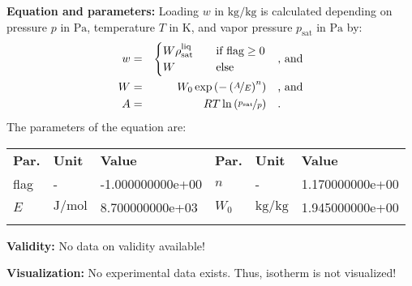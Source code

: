 \textbf{Equation and parameters:}
\newline
%
Loading $w$ in $\si{\kilogram\per\kilogram}$ is calculated depending on pressure $p$ in $\si{\pascal}$, temperature $T$ in $\si{\kelvin}$, and vapor pressure $p_\mathrm{sat}$ in $\si{\pascal}$ by:
%
\begin{equation*}
\begin{split}
w &=& \begin{cases} W \rho_\mathrm{sat}^{\mathrm{liq}} & \quad \text{if flag} \geq 0 \\ W & \quad \text{else} \end{cases} & \quad\text{, and} \\
W &=& W_0 \exp \left( - \left( \nicefrac{A}{E} \right) ^{n} \right) & \quad\text{, and} \\
A &=& R T \ln \left( \nicefrac{p_\mathrm{sat}}{p} \right) & \quad\text{.} \\
\end{split}
\end{equation*}
%
The parameters of the equation are:
%
\begin{longtable}[l]{lll|lll}
\toprule
\addlinespace
\textbf{Par.} & \textbf{Unit} & \textbf{Value} &	\textbf{Par.} & \textbf{Unit} & \textbf{Value} \\
\addlinespace
\midrule
\endhead

\bottomrule
\endfoot
\bottomrule
\endlastfoot
\addlinespace

flag & - & -1.000000000e+00 & $n$ & - & 1.170000000e+00 \\
$E$ & $\si{\joule\per\mole}$ & 8.700000000e+03 & $W_0$ & $\si{\kilogram\per\kilogram}$ & 1.945000000e+00 \\

\addlinespace\end{longtable}

\textbf{Validity:}
\newline
No data on validity available!
\newline

\textbf{Visualization:}
%
\newline
No experimental data exists. Thus, isotherm is not visualized!
%

\FloatBarrier
\newpage
